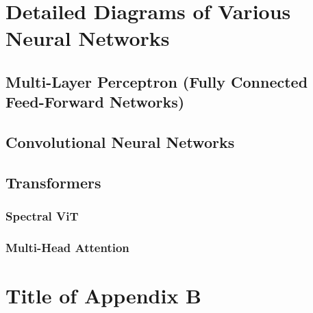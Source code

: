 \chapter{Detailed Diagrams of Various Neural Networks}
\label{chap:NNArch}
\section{Multi-Layer Perceptron (Fully Connected Feed-Forward Networks)}
\label{app:MLP}


\section{Convolutional Neural Networks}
\label{app:CNN}


\section{Transformers}
\label{app:transformer}

\subsection{Spectral ViT}
\label{app:SpecViT}

\subsection{Multi-Head Attention}
\label{app:MHA}


\chapter{Title of Appendix B}
